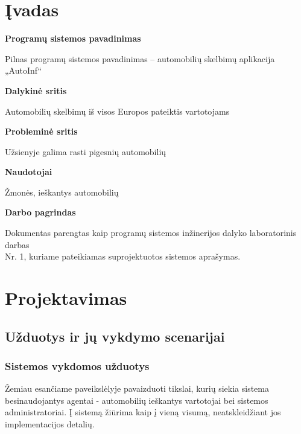 \documentclass[12pt]{article}
\begin{document}
	\tableofcontents
	\pagebreak

	\section*{Įvadas}
	
	\begin{flushleft}
		\bigbreak\textbf{Programų sistemos pavadinimas}
	\end{flushleft}
	
	Pilnas programų sistemos pavadinimas – automobilių skelbimų aplikacija „AutoInf“ \\
	
	\begin{flushleft}
		\textbf{Dalykinė sritis}
	\end{flushleft}	
	
	Automobilių skelbimų iš visos Europos pateiktis vartotojams  \\
	
	\begin{flushleft}
		\textbf{Probleminė sritis}
	\end{flushleft}
	
	Užsienyje galima rasti pigesnių automobilių \\
	
	\begin{flushleft}
		\textbf{Naudotojai} 
	\end{flushleft}
	
	Žmonės, ieškantys automobilių \\
	
	\begin{flushleft}
		\textbf{Darbo pagrindas}
	\end{flushleft}
	
	Dokumentas parengtas kaip programų sistemos inžinerijos dalyko laboratorinis darbas\\Nr. 1, kuriame pateikiamas suprojektuotos sistemos aprašymas.
	\pagebreak

	\section{Projektavimas}
	\subsection{Užduotys ir jų vykdymo scenarijai}
	\subsubsection{Sistemos vykdomos užduotys}
	Žemiau esančiame paveikslėlyje pavaizduoti tikslai, kurių siekia sistema besinaudojantys agentai - automobilių ieškantys vartotojai bei sistemos administratoriai. Į sistemą žiūrima kaip į vieną visumą, neatskleidžiant jos implementacijos detalių.
	
\end{document}
